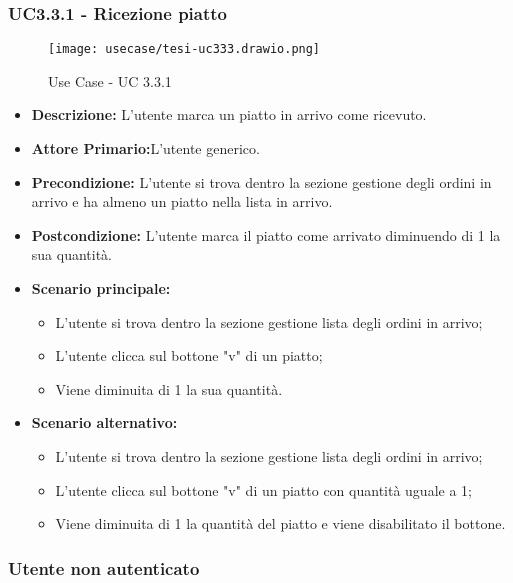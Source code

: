 \subsubsection{UC3.3.1 - Ricezione piatto}
\begin{figure}[H]
    \centering
    \texttt{[image: usecase/tesi-uc333.drawio.png]}
    \caption{Use Case - UC 3.3.1}
\end{figure}
\begin{itemize}
    \item \textbf{Descrizione:} L'utente marca un piatto in arrivo come ricevuto.
    \item \textbf{Attore Primario:}L'utente generico.
    \item \textbf{Precondizione:} L'utente si trova dentro la sezione gestione degli ordini in arrivo e ha almeno un piatto nella lista in arrivo.
    \item \textbf{Postcondizione:} L'utente marca il piatto come arrivato diminuendo di 1 la sua quantità.
    \item \textbf{Scenario principale:}
    \begin{itemize}
        \item L'utente si trova dentro la sezione gestione lista degli ordini in arrivo;
        \item L'utente clicca sul bottone "v" di un piatto;
        \item Viene diminuita di 1 la sua quantità.
    \end{itemize}
    \item \textbf{Scenario alternativo:}
    \begin{itemize}
        \item L'utente si trova dentro la sezione gestione lista degli ordini in arrivo;
        \item L'utente clicca sul bottone "v" di un piatto con quantità uguale a 1;
        \item Viene diminuita di 1 la quantità del piatto e viene disabilitato il bottone.
    \end{itemize}
\end{itemize}

\subsubsection{Utente non autenticato}\\
